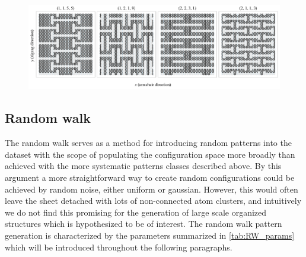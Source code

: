 \begin{figure}[H]
  \centering
  \includegraphics[width=\linewidth]{figures/system/honeycomb_flavors.pdf}
  \caption{}
  \label{fig:honeycomb_flavors}
\end{figure}




\subsection{Random walk}
The random walk serves as a method for introducing random patterns into the dataset with the scope of populating the configuration space more broadly than achieved with the more systematic patterns classes described above. By this argument a more straightforward way to create random configurations could be achieved by random noise, either uniform or gaussian. However, this would often leave the sheet detached with lots of non-connected atom clusters, and intuitively we do not find this promising for the generation of large scale organized structures which is hypothesized to be of interest. The random walk pattern generation is characterized by the parameters summarized in \cref{tab:RW_params} which will be introduced throughout the following paragraphs. 


